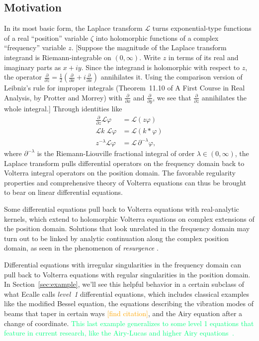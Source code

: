 \documentclass{article}
\theoremstyle{plain}
\newcommand{\laplace}{\mathcal{L}}
\newenvironment{verify}{\color{ForestGreen}}{\color{black}}
\begin{document}
\subsection{Motivation}\label{motivation}
In its most basic form, the Laplace transform $\laplace$ turns exponential-type functions of a real ``position'' variable $\zeta$ into holomorphic functions of a complex ``frequency'' variable $z$. \begin{verify}[Suppose the magnitude of the Laplace transform integrand is Riemann-integrable on $(0, \infty)$. Write $z$ in terms of its real and imaginary parts as $x + iy$. Since the integrand is holomorphic with respect to $z$, the operator $\frac{\partial}{\partial\overline{z}} = \frac{1}{2}\left(\frac{\partial}{\partial x} + i\frac{\partial}{\partial x}\right)$ annihilates it. Using the comparison version of Leibniz's rule for improper integrals (Theorem~11.10 of A First Course in Real Analysis, by Protter and Morrey) with $\frac{\partial}{\partial x}$ and $\frac{\partial}{\partial y}$, we see that $\frac{\partial}{\partial\overline{z}}$ annihilates the whole integral.]\end{verify} Through identities like
\begin{align*}
\frac{\partial}{\partial z} \laplace \varphi & = \laplace(z\varphi) \\
\laplace k\;\laplace \varphi & = \laplace(k * \varphi) \\
z^{-\lambda} \laplace \varphi & = \laplace\,\partial^{-\lambda} \varphi,
\end{align*}
where $\partial^{-\lambda}$ is the Riemann-Liouville fractional integral of order $\lambda \in (0, \infty)$, the Laplace transform pulls differential operators on the frequency domain back to Volterra integral operators on the position domain. The favorable regularity properties and comprehensive theory of Volterra equations can thus be brought to bear on linear differential equations.

Some differential equations pull back to Volterra equations with real-analytic kernels, which extend to holomorphic Volterra equations on complex extensions of the position domain. Solutions that look unrelated in the frequency domain may turn out to be linked by analytic continuation along the complex position domain, as seen in the phenomenon of {\em resurgence} \cite{EcalleIII}\cite{lectures-marino}\cite[Section 2.4]{sternin1995borel}.

Differential equations with irregular singularities in the frequency domain can pull back to Volterra equations with regular singularities in the position domain. In Section~\ref{sec:example}, we'll see this helpful behavior in a certain subclass of what Ecalle calls {\em level~1} differential equations, which includes classical examples like the modified Bessel equation, the equations describing the vibration modes of beams that taper in certain ways \textcolor{orange}{[find citation]}, and the Airy equation after a change of coordinate. \textcolor{SpringGreen}{This last example generalizes to some level 1 equations that feature in current research, like the Airy-Lucas and higher Airy equations~\cite[Equations 3.2 and 3.8]{charbonnier22}\cite{durugo_higher}.}
\end{document}
